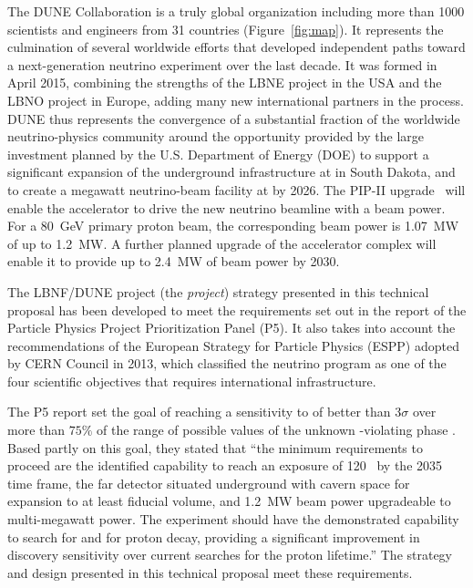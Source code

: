 The DUNE Collaboration is a truly global organization including more than \num{1000} scientists and engineers from \num{31} countries (Figure~\ref{fig:map}). It represents
the culmination of several worldwide efforts that developed independent paths toward a next-generation  neutrino experiment over the last decade.
It was formed in April 2015, combining the strengths of the LBNE project in the USA and the LBNO project in Europe, adding many new international 
partners in the process. DUNE thus represents the convergence of a substantial fraction of the worldwide neutrino-physics community around the 
opportunity provided by the large investment planned by the U.S. Department of Energy (DOE) to support 
a significant expansion of the underground infrastructure at \surf in South Dakota, and to create a megawatt neutrino-beam facility at  \fnal by 2026. 
The PIP-II upgrade~\cite{pip2-2013}
will enable the accelerator to drive the new neutrino beamline with a beam power. %
For a \SI{80}{\GeV} primary proton beam, the corresponding beam power is \SI{1.07}{\MW} of up to \SI{1.2}{\MW}. A further planned upgrade 
of the accelerator complex will enable it to provide up to \SI{2.4}{\MW} of beam power by 2030.  

The LBNF/DUNE project (the \textit{project}) strategy presented in this technical proposal has been developed to meet the requirements set out in the report of the Particle Physics Project Prioritization Panel (P5). It also takes into account the recommendations of the European Strategy for Particle  Physics (ESPP) adopted by CERN Council in 2013, which classified the  neutrino program as one of the four scientific objectives that requires international infrastructure.

The P5 report set the goal of reaching a sensitivity to  of better than \num{3}$\sigma$ over more than $75\%$ 
of the range of possible values of the unknown -violating phase \deltacp.
Based partly on this goal, they stated that ``the 
minimum requirements to proceed are the identified capability to reach an exposure 
of \num{120}~\ktMWyr{} by the 2035 time frame, the far detector situated underground 
with cavern space for expansion to at least \fdfiducialmass \lar fiducial volume, and \SI{1.2}{MW} 
beam power upgradeable to multi-megawatt power.
The experiment should have the demonstrated 
capability to search for  and for proton decay, providing a significant 
improvement in discovery sensitivity over current searches for the proton lifetime.'' The strategy and design presented in this technical proposal meet these requirements.


